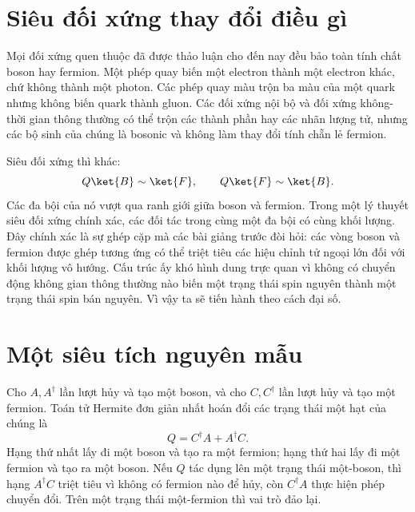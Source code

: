 \section{Siêu đối xứng thay đổi điều gì}

Mọi đối xứng quen thuộc đã được thảo luận cho đến nay đều bảo toàn tính chất boson hay fermion. Một phép quay biến một electron thành một electron khác, chứ không thành một photon. Các phép quay màu trộn ba màu của một quark nhưng không biến quark thành gluon. Các đối xứng nội bộ và đối xứng không-thời gian thông thường có thể trộn các thành phần hay các nhãn lượng tử, nhưng các bộ sinh của chúng là bosonic và không làm thay đổi tính chẵn lẻ fermion.

Siêu đối xứng thì khác:
\begin{equation}
Q\ket{B}\sim\ket{F},
\qquad
Q\ket{F}\sim\ket{B}.
\end{equation}
Các đa bội của nó vượt qua ranh giới giữa boson và fermion. Trong một lý thuyết siêu đối xứng chính xác, các đối tác trong cùng một đa bội có cùng khối lượng. Đây chính xác là sự ghép cặp mà các bài giảng trước đòi hỏi: các vòng boson và fermion được ghép tương ứng có thể triệt tiêu các hiệu chỉnh tử ngoại lớn đối với khối lượng vô hướng. Cấu trúc ấy khó hình dung trực quan vì không có chuyển động không gian thông thường nào biến một trạng thái spin nguyên thành một trạng thái spin bán nguyên. Vì vậy ta sẽ tiến hành theo cách đại số.

\section{Một siêu tích nguyên mẫu}

Cho \(A,A^\dagger\) lần lượt hủy và tạo một boson, và cho \(C,C^\dagger\) lần lượt hủy và tạo một fermion. Toán tử Hermite đơn giản nhất hoán đổi các trạng thái một hạt của chúng là
\begin{equation}
Q=C^\dagger A+A^\dagger C.
\end{equation}
Hạng thứ nhất lấy đi một boson và tạo ra một fermion; hạng thứ hai lấy đi một fermion và tạo ra một boson. Nếu \(Q\) tác dụng lên một trạng thái một-boson, thì hạng \(A^\dagger C\) triệt tiêu vì không có fermion nào để hủy, còn \(C^\dagger A\) thực hiện phép chuyển đổi. Trên một trạng thái một-fermion thì vai trò đảo lại.

\begin{classroomqa}
\end{classroomqa}

